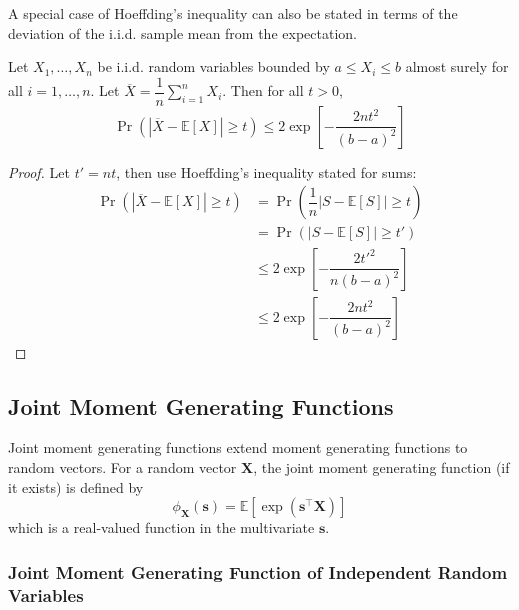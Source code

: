 \documentclass[11pt]{report} %
\begin{document}
A special case of Hoeffding's inequality can also be stated in terms of the deviation of the i.i.d. sample mean from the expectation.
\begin{corollary}
Let $X_{1}, \dots, X_{n}$ be i.i.d. random variables bounded by $a \leq X_{i} \leq b$ almost surely for all $i = 1, \dots, n$. Let $\overline{X} = \dfrac{1}{n}\sum_{i = 1}^{n}X_{i}$. Then for all $t > 0$,
\begin{equation}
\operatorname{Pr}\left(\left|\overline{X} - \mathbb{E}\left[X\right]\right| \geq t\right) \leq 2\exp\left[-\dfrac{2nt^{2}}{\left(b - a\right)^{2}} \right]
\end{equation}
\end{corollary}
\begin{proof}
Let $t' = nt$, then use Hoeffding's inequality stated for sums:
\begin{align}
\operatorname{Pr}\left(\left|\overline{X} - \mathbb{E}\left[X\right]\right| \geq t\right) &= \operatorname{Pr}\left(\dfrac{1}{n}\left|S - \mathbb{E}\left[S\right]\right| \geq t\right) \\
&= \operatorname{Pr}\left(\left|S - \mathbb{E}\left[S\right]\right| \geq t'\right) \\
&\leq 2\exp\left[-\dfrac{2t'^{2}}{n\left(b - a\right)^{2}} \right] \\
&\leq 2\exp\left[-\dfrac{2nt^{2}}{\left(b - a\right)^{2}} \right]
\end{align}
\end{proof}

\subsection{Joint Moment Generating Functions}

Joint moment generating functions extend moment generating functions to random vectors. For a random vector $\mathbf{X}$, the joint moment generating function (if it exists) is defined by
\begin{equation}
\phi_{\mathbf{X}}\left(\mathbf{s}\right) = \mathbb{E}\left[\exp\left(\mathbf{s}^{\top}\mathbf{X}\right)\right]
\end{equation}
which is a real-valued function in the multivariate $\mathbf{s}$.

\subsubsection{Joint Moment Generating Function of Independent Random Variables}
\end{document}
